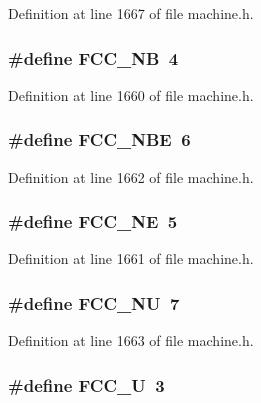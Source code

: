 Definition at line 1667 of file machine.h.
\subsubsection[{FCC\_\-NB}]{\setlength{\rightskip}{0pt plus 5cm}\#define FCC\_\-NB~4}\label{machine_8h_7dbacc93b1be0c2c73e278292e64df5b}




Definition at line 1660 of file machine.h.
\subsubsection[{FCC\_\-NBE}]{\setlength{\rightskip}{0pt plus 5cm}\#define FCC\_\-NBE~6}\label{machine_8h_d0cc6e0cc6186e06c77ce00fd319436d}




Definition at line 1662 of file machine.h.
\subsubsection[{FCC\_\-NE}]{\setlength{\rightskip}{0pt plus 5cm}\#define FCC\_\-NE~5}\label{machine_8h_37a30499983a8a0b421b3ff28fc42f25}




Definition at line 1661 of file machine.h.
\subsubsection[{FCC\_\-NU}]{\setlength{\rightskip}{0pt plus 5cm}\#define FCC\_\-NU~7}\label{machine_8h_363be85b47df3ee7b201c4f71590fe9f}




Definition at line 1663 of file machine.h.
\subsubsection[{FCC\_\-U}]{\setlength{\rightskip}{0pt plus 5cm}\#define FCC\_\-U~3}\label{machine_8h_06e3c1167829a81774d20a317a56afd8}




